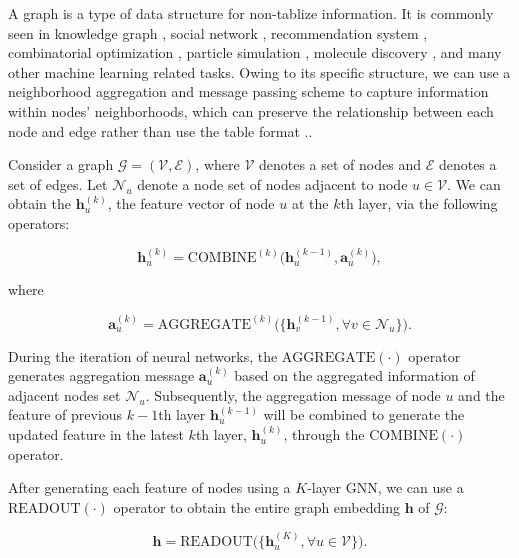 A graph is a type of data structure for non-tablize information. It is commonly seen in knowledge graph \cite{knowledge}, social network \cite{social}, recommendation system \cite{recommender}, combinatorial optimization \cite{combinatorial}, particle simulation \cite{particle}, molecule discovery \cite{antibiotic}, and many other machine learning related tasks. Owing to its specific structure, we can use a neighborhood aggregation and message passing scheme to capture information within nodes' neighborhoods, which can preserve the relationship between each node and edge rather than use the table format \cite{comprehensive}..


Consider a graph $\mathcal{G} = (\mathcal{V},\mathcal{E})$, where $\mathcal{V}$ denotes a set of nodes and $\mathcal{E}$ denotes a set of edges. Let $\mathcal{N}_{u}$ denote a node set of nodes adjacent to node $u\in \mathcal{V}$. We can obtain the $\mathbf{h}_{u}^{(k)}$, the feature vector of node $u$ at the $k$th layer, via the following operators:




\begin{equation}
\mathbf{h}_{u}^{(k)}=\text{COMBINE}^{(k)}\Big(\mathbf{h}_{u}^{(k-1)},\mathbf{a}_{u}^{(k)}\Big),
\end{equation}

where

\begin{equation}
\mathbf{a}_{u}^{(k)}=\text{AGGREGATE}^{(k)}\Big(\{\mathbf{h}_{v}^{(k-1)}, \forall v\in\mathcal{N}_{u}\}\Big).
\end{equation}

During the iteration of neural networks, the $\text{AGGREGATE}(\cdot)$ operator generates aggregation message $\mathbf{a}_{u}^{(k)}$ based on the aggregated information of adjacent nodes set $\mathcal{N}_{u}$. Subsequently, the aggregation message of node $u$ and the feature of previous $k-1$th layer $\mathbf{h}_{u}^{(k-1)}$ will be combined to generate the updated feature in the latest $k$th layer, $\mathbf{h}_{u}^{(k)}$, through the $\text{COMBINE}(\cdot)$ operator.

After generating each feature of nodes using a $K$-layer GNN, we can use a $\text{READOUT}(\cdot)$ operator to obtain the entire graph embedding $\mathbf{h}$ of $\mathcal{G}$:


\begin{equation}
\mathbf{h}=\text{READOUT}\Big(\{\mathbf{h}_{u}^{(K)}, \forall u\in\mathcal{V}\}\Big).
\end{equation}


